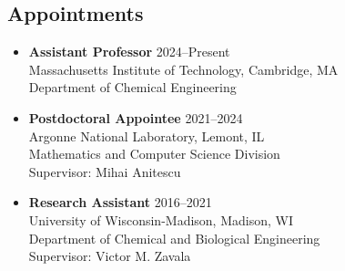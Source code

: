 \documentclass[letterpaper, 11pt]{article}
\begin{document}
\subsection*{Appointments}
\begin{itemize}[leftmargin=*]
\item[] {\bf Assistant Professor} \hfill 2024--Present\\
Massachusetts Institute of Technology, Cambridge, MA\\
Department of Chemical Engineering
\item[] {\bf Postdoctoral Appointee} \hfill 2021--2024\\
  Argonne National Laboratory, Lemont, IL\\
  Mathematics and Computer Science Division \\
  Supervisor: Mihai Anitescu
\item[] {\bf Research Assistant} \hfill 2016--2021\\
  University of Wisconsin-Madison, Madison, WI\\
  Department of Chemical and Biological Engineering \\
  Supervisor: Victor M. Zavala

\end{itemize}
\end{document}
